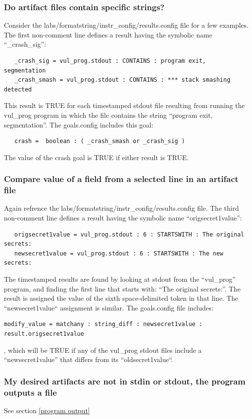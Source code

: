 \documentclass[12pt]{article}
\begin{document}
\subsubsection{Do artifact files contain specific strings?}
Consider the labs/formatstring/instr\_config/results.config file for a few examples.  
The first non-comment line defines a result having the symbolic name ``\_crash\_sig'':
\begin{verbatim}
   _crash_sig = vul_prog.stdout : CONTAINS : program exit, segmentation
   _crash_smash = vul_prog.stdout : CONTAINS : *** stack smashing detected
\end{verbatim}
\noindent This result is TRUE for each timestamped stdout file resulting from running 
the vul\_prog program in which the file contains the string ``program exit, segmentation''.
The goals.config includes this goal:
\begin{verbatim}
   crash =  boolean : ( _crash_smash or _crash_sig )
\end{verbatim}
\noindent The value of the crash goal is TRUE if either result is TRUE.

\subsubsection{Compare value of a field from a selected line in an artifact file}
Again refrence the labs/formatstring/instr\_config/results.config file.  The third non-comment line
defines a result having the symbolic name ``origsecret1value'':  
\begin{verbatim}
   origsecret1value = vul_prog.stdout : 6 : STARTSWITH : The original secrets:
   newsecret1value = vul_prog.stdout : 6 : STARTSWITH : The new secrets:
\end{verbatim}
\noindent The timestamped results are
found by looking at stdout from the ``vul\_prog'' program, and finding the first line that starts with:
``The original secrets:''.  The result is assigned the value of the sixth space-delimited 
token in that line.  The ``newsecret1value`` assignment is similar.  The goals.config file includes:
\begin{verbatim}
modify_value = matchany : string_diff : newsecret1value : result.origsecret1value
\end{verbatim}
\noindent , which will be TRUE if any of the vul\_prog stdout files include a
``newsecret1value'' that differs from its ``oldsecret1value``.

\subsubsection{My desired artifacts are not in stdin or stdout, the program outputs a file}
See section \ref{program output}
\end{document}
